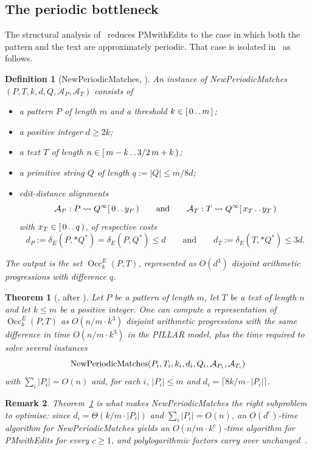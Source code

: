 \documentclass[10pt]{article}
\newtheorem{definition}{Definition}
\newtheorem{theorem}{Theorem}
\newtheorem{remark}[theorem]{Remark}
\newcommand{\dE}{\delta_E}
\newcommand{\Occ}{\operatorname{Occ}^E}
\newcommand{\PILLAR}{\textnormal{PILLAR}}
\newcommand{\PMwE}{\textnormal{PMwith\hspace{0pt}Edits}}
\newcommand{\NPM}{\textnormal{New\hspace{0pt}Periodic\hspace{0pt}Matches}}
\begin{document}
\subsection{The periodic bottleneck}\label{sec:npm}

The structural analysis of~\cite{CKW20} reduces \PMwE{} to the case in which
both the pattern and the text are approximately periodic. That case is
isolated in~\cite{CKW22} as follows.

\begin{definition}[\NPM{}, {\cite[Section 1.3]{CKW22}}]\label{def:npm}
An instance of \NPM$(P,T,k,d,Q,\mathcal A_P,\mathcal A_T)$ consists of
\begin{itemize}
    \item a pattern $P$ of length $m$ and a threshold $k\in[\,0\mathinner{.\,.}m\,]$;
    \item a positive integer $d\ge 2k$;
    \item a text $T$ of length $n\in[\,m-k\mathinner{.\,.}3/2\,m+k\,)$;
    \item a primitive string $Q$ of length $q:=|Q|\le m/8d$;
    \item edit-distance alignments
    \[
    \mathcal A_P:P\rightsquigarrow Q^\infty[\,0\mathinner{.\,.}y_P\,)
    \qquad\text{and}\qquad
    \mathcal A_T:T\rightsquigarrow Q^\infty[\,x_T\mathinner{.\,.}y_T\,)
    \]
    with $x_T\in[\,0\mathinner{.\,.}q\,)$, of respective costs
    \[
    d_P:=\dE(P,{*}Q^*)=\dE(P,Q^*)\le d
    \qquad\text{and}\qquad
    d_T:=\dE(T,{*}Q^*)\le3d.
    \]
\end{itemize}
The output is the set $\Occ_k(P,T)$, represented as $O(d^3)$ disjoint
arithmetic progressions with difference $q$.
\end{definition}

\begin{theorem}[{\cite[Fact 1.1]{CKW22}}, after {\cite{CKW20}}]\label{thm:reduction}
Let $P$ be a pattern of length $m$, let $T$ be a text of length $n$ and let
$k\le m$ be a positive integer. One can compute a representation of
$\Occ_k(P,T)$ as $O(n/m\cdot k^3)$ disjoint arithmetic progressions with the
same difference in time $O(n/m\cdot k^3)$ in the \PILLAR{} model, plus the time
required to solve several instances
\[
\NPM(P_i,T_i,k_i,d_i,Q_i,\mathcal A_{P_i},\mathcal A_{T_i})
\]
with $\sum_i|P_i|=O(n)$ and, for each $i$, $|P_i|\le m$ and
$d_i=\lceil 8k/m\cdot|P_i|\rceil$.
\end{theorem}

\begin{remark}\label{rem:npmscaling}
Theorem~\ref{thm:reduction} is what makes \NPM{} the right subproblem to
optimise: since $d_i=\Theta(k/m\cdot|P_i|)$ and $\sum_i|P_i|=O(n)$, an
$O(d^{c})$-time algorithm for \NPM{} yields an $O(n/m\cdot k^{c})$-time
algorithm for \PMwE{} for every $c\ge1$, and polylogarithmic factors carry over
unchanged~\cite[proof of Main Theorem 2]{CKW22}.
\end{remark}
\end{document}
